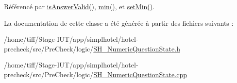 Référencé par \hyperlink{classSH__NumericQuestionState_afa783a2ebc3875bc6b8c3d823e24e30b}{is\-Answer\-Valid()}, \hyperlink{classSH__NumericQuestionState_a5acb66d7a0365c9850195e5b9a2d5145}{min()}, et \hyperlink{classSH__NumericQuestionState_a62180ba1751ef8e523cb1e73c58b3ab6}{set\-Min()}.



La documentation de cette classe a été générée à partir des fichiers suivants \-:\begin{DoxyCompactItemize}
\item 
/home/tiff/\-Stage-\/\-I\-U\-T/app/simplhotel/hotel-\/precheck/src/\-Pre\-Check/logic/\hyperlink{SH__NumericQuestionState_8h}{S\-H\-\_\-\-Numeric\-Question\-State.\-h}\item 
/home/tiff/\-Stage-\/\-I\-U\-T/app/simplhotel/hotel-\/precheck/src/\-Pre\-Check/logic/\hyperlink{SH__NumericQuestionState_8cpp}{S\-H\-\_\-\-Numeric\-Question\-State.\-cpp}\end{DoxyCompactItemize}
